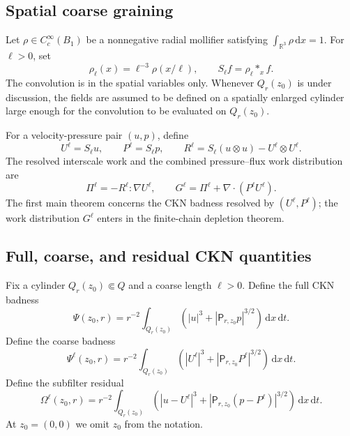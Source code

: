 \documentclass[11pt]{article}
\numberwithin{equation}{section}
\newcommand{\R}{\mathbb R}
\newcommand{\dx}{\,\mathrm dx}
\newcommand{\dxdt}{\,\mathrm dx\,\mathrm dt}
\newcommand{\Pf}{\mathsf P}
\begin{document}
\subsection{Spatial coarse graining}

Let $\rho\in C_c^\infty(B_1)$ be a nonnegative radial mollifier satisfying $\int_{\R^3}\rho\dx=1$.  For $\ell>0$, set
\[
\rho_\ell(x)=\ell^{-3}\rho(x/\ell),
\qquad
S_\ell f=\rho_\ell *_x f.
\]
The convolution is in the spatial variables only.  Whenever $Q_r(z_0)$ is under discussion, the fields are assumed to be defined on a spatially enlarged cylinder large enough for the convolution to be evaluated on $Q_r(z_0)$.

For a velocity-pressure pair $(u,p)$, define
\begin{equation}\label{eq:coarse-fields}
U^\ell=S_\ell u,
\qquad
P^\ell=S_\ell p,
\qquad
R^\ell=S_\ell(u\otimes u)-U^\ell\otimes U^\ell.
\end{equation}
The resolved interscale work and the combined pressure--flux work distribution are
\begin{equation}\label{eq:work-defs}
\Pi^\ell=-R^\ell:\nabla U^\ell,
\qquad
G^\ell=\Pi^\ell+\nabla\cdot(P^\ell U^\ell).
\end{equation}
The first main theorem concerns the CKN badness resolved by $(U^\ell,P^\ell)$; the work distribution $G^\ell$ enters in the finite-chain depletion theorem.

\subsection{Full, coarse, and residual CKN quantities}

Fix a cylinder $Q_r(z_0)\Subset Q$ and a coarse length $\ell>0$.  Define the full CKN badness
\begin{equation}\label{eq:Psi-full}
\Psi(z_0,r)=r^{-2}\int_{Q_r(z_0)}\left(|u|^3+|\Pf_{r,z_0}p|^{3/2}\right)\dxdt.
\end{equation}
Define the coarse badness
\begin{equation}\label{eq:Psi-coarse}
\Psi^\ell(z_0,r)=r^{-2}\int_{Q_r(z_0)}\left(|U^\ell|^3+|\Pf_{r,z_0}P^\ell|^{3/2}\right)\dxdt.
\end{equation}
Define the subfilter residual
\begin{equation}\label{eq:Omega-residual}
\Omega^\ell(z_0,r)=r^{-2}\int_{Q_r(z_0)}\left(|u-U^\ell|^3+|\Pf_{r,z_0}(p-P^\ell)|^{3/2}\right)\dxdt.
\end{equation}
At $z_0=(0,0)$ we omit $z_0$ from the notation.
\end{document}
